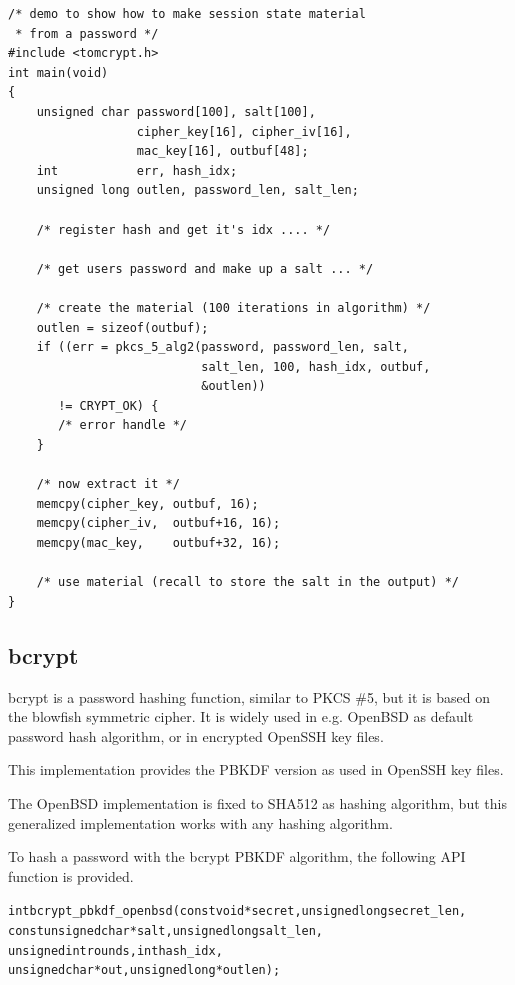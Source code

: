 \documentclass[synpaper]{book}
\begin{document}
\begin{verbatim}
/* demo to show how to make session state material
 * from a password */
#include <tomcrypt.h>
int main(void)
{
    unsigned char password[100], salt[100],
                  cipher_key[16], cipher_iv[16],
                  mac_key[16], outbuf[48];
    int           err, hash_idx;
    unsigned long outlen, password_len, salt_len;

    /* register hash and get it's idx .... */

    /* get users password and make up a salt ... */

    /* create the material (100 iterations in algorithm) */
    outlen = sizeof(outbuf);
    if ((err = pkcs_5_alg2(password, password_len, salt,
                           salt_len, 100, hash_idx, outbuf,
                           &outlen))
       != CRYPT_OK) {
       /* error handle */
    }

    /* now extract it */
    memcpy(cipher_key, outbuf, 16);
    memcpy(cipher_iv,  outbuf+16, 16);
    memcpy(mac_key,    outbuf+32, 16);

    /* use material (recall to store the salt in the output) */
}
\end{verbatim}


\subsection{bcrypt}
\label{bcrypt}

bcrypt is a password hashing function, similar to PKCS \#5, but it is based on the blowfish symmetric cipher.
It is widely used in e.g. OpenBSD as default password hash algorithm, or in encrypted OpenSSH key files.

This implementation provides the PBKDF version as used in OpenSSH key files.

The OpenBSD implementation is fixed to SHA512 as hashing algorithm, but this generalized implementation works with any hashing algorithm.

To hash a password with the bcrypt PBKDF algorithm, the following API function is provided.

\begin{alltt}
int bcrypt_pbkdf_openbsd(const          void *secret, unsigned long secret_len,
                         const unsigned char *salt,   unsigned long salt_len,
                               unsigned int  rounds,            int hash_idx,
                               unsigned char *out,    unsigned long *outlen);
\end{alltt}
\end{document}
